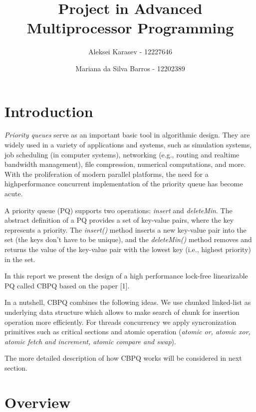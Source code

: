 \documentclass{article}
\begin{document}
\title{Project in Advanced Multiprocessor Programming}
\author[1]{Aleksei Karasev - 12227646\\}
\author[2]{Mariana da Silva Barros - 12202389}
\maketitle

\section{Introduction}\mbox{}\par
\textit{Priority queues} serve as an important basic tool in algorithmic design.
They are widely used in a variety of applications and systems, such as simulation systems, job scheduling (in computer systems), networking (e.g., routing and realtime bandwidth management), file compression, numerical computations, and
more. With the proliferation of modern parallel platforms, the need for a highperformance concurrent implementation of the priority queue has become acute.\par
A priority queue (PQ) supports two operations: \textit{insert} and \textit{deleteMin}. The
abstract definition of a PQ provides a set of key-value pairs, where the key
represents a priority. The \textit{insert()} method inserts a new key-value pair into the
set (the keys don’t have to be unique), and the \textit{deleteMin()} method removes and
returns the value of the key-value pair with the lowest key (i.e., highest priority)
in the set.\par
In this report we present the design of a high performance lock-free linearizable PQ called CBPQ based on the paper [1].\par
In a nutshell, CBPQ combines the following ideas. We use chunked linked-list as underlying data structure which allows to make search of chunk for insertion operation more efficiently. For threads concurrency we apply syncronization primitives such as critical sections and atomic operation (\textit{atomic or, atomic xor, atomic fetch and increment, atomic compare and swap}).\par
The more detailed description of how CBPQ works will be considered in next section.

\section{Overview}
\end{document}
